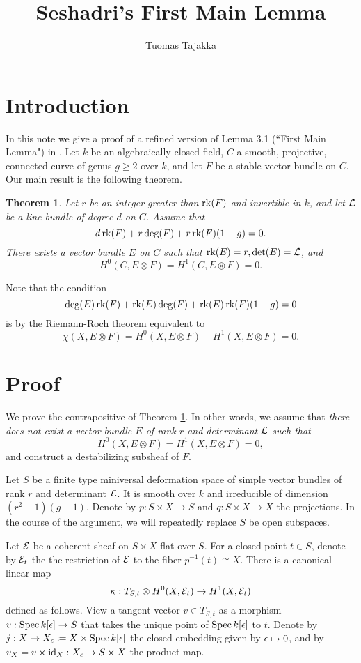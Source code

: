 \documentclass[letterpaper,12pt]{article}
\title{Seshadri's First Main Lemma}
\author{Tuomas Tajakka}
\date{}
\newtheorem{thm}{Theorem}[section]
\theoremstyle{remark}
\begin{document}
\maketitle

\section{Introduction}
In this note we give a proof of a refined version of Lemma 3.1 (``First Main Lemma") in \cite{seshadri}. Let $k$ be an algebraically closed field, $C$ a smooth, projective, connected curve of genus $g \ge 2$ over $k$, and let $F$ be a stable vector bundle on $C$. Our main result is the following theorem.

\begin{thm}\label{mainlemma1}
    Let $r$ be an integer greater than $\operatorname{\mathrm{rk}}(F)$ and invertible in $k$, and let $\mathcal{L}$ be a line bundle of degree $d$ on $C$. Assume that
    \[ d \operatorname{\mathrm{rk}}(F) + r \deg(F) + r \operatorname{\mathrm{rk}}(F) (1-g) = 0. \]
    There exists a vector bundle $E$ on $C$ such that $\operatorname{\mathrm{rk}}(E) = r, \det(E) = \mathcal{L}$, and 
    \[ H^0(C, E \otimes F) = H^1(C, E \otimes F) = 0. \]
\end{thm}
Note that the condition
\[ \deg(E) \operatorname{\mathrm{rk}}(F) + \operatorname{\mathrm{rk}}(E) \deg(F) + \operatorname{\mathrm{rk}}(E) \operatorname{\mathrm{rk}}(F) (1-g) = 0 \]
is by the Riemann-Roch theorem equivalent to
\[ \chi(X, E \otimes F) = H^0(X, E \otimes F) - H^1(X, E \otimes F) = 0. \]

\section{Proof}
We prove the contrapositive of Theorem \ref{mainlemma1}. In other words, we assume that \emph{there does not exist a vector bundle $E$ of rank $r$ and determinant $\mathcal{L}$ such that} 
\[ H^0(X, E \otimes F) = H^1(X, E \otimes F) = 0, \]
and construct a destabilizing subsheaf of $F$.

Let $S$ be a finite type miniversal deformation space of simple vector bundles of rank $r$ and determinant $\mathcal{L}$. It is smooth over $k$ and irreducible of dimension $(r^2 - 1)(g-1)$. Denote by $p: S \times X \to S$ and $q: S \times X \to X$ the projections. In the course of the argument, we will repeatedly replace $S$ be open subspaces.

Let $\mathcal{E}$ be a coherent sheaf on $S \times X$ flat over $S$. For a closed point $t \in S$, denote by $\mathcal{E}_t$ the the restriction of $\mathcal{E}$ to the fiber $p^{-1}(t) \cong X$. There is a canonical linear map
\[ \kappa: T_{S,t} \otimes H^0(X, \mathcal{E}_t) \to H^1(X, \mathcal{E}_t) \]
defined as follows. View a tangent vector $v \in T_{S,t}$ as a morphism $v: \operatorname{\mathrm{Spec}} k[\epsilon] \to S$ that takes the unique point of $\operatorname{\mathrm{Spec}} k[\epsilon]$ to $t$. Denote by $j: X \to X_\epsilon \coloneqq X \times \operatorname{\mathrm{Spec}} k[\epsilon]$ the closed embedding given by $\epsilon \mapsto 0$, and by $v_X = v \times \mathrm{id}_X: X_\epsilon \to S\times X$ the product map.
\end{document}
